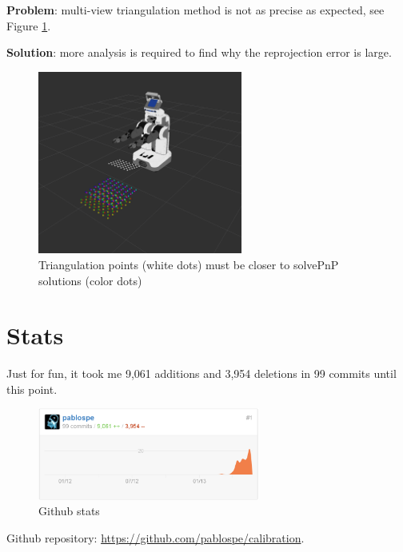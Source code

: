 \textbf{Problem}: multi-view triangulation method is not as precise as expected, see Figure \ref{fig:triangulation_fails}.

\noindent
\textbf{Solution}: more analysis is required to find why the reprojection error is large.

\begin{figure}[!htbp]
 \centering
 \includegraphics[width=0.6\textwidth]{images/screenshots/triangulation_fails.png}
 \caption{Triangulation points (white dots) must be closer to solvePnP solutions (color dots)}
 \label{fig:triangulation_fails}
\end{figure}

\vspace*{-2ex}
\section{Stats}
Just for fun, it took me 9,061 additions and 3,954 deletions in 99 commits until this point.
\begin{figure}[!htbp]
 \centering
 \includegraphics[width=0.65\textwidth]{images/git_stats.png}
 \caption{Github stats}
 \label{fig:git_stats}
\end{figure}

Github repository: \url{https://github.com/pablospe/calibration}.

%
%


